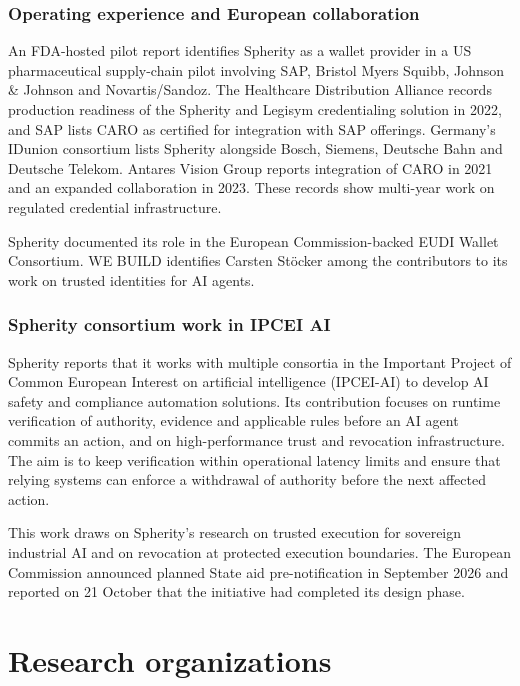 \subsubsection{Operating experience and European collaboration}

An FDA-hosted pilot report identifies Spherity as a wallet provider in a US pharmaceutical supply-chain pilot involving SAP, Bristol Myers Squibb, Johnson \& Johnson and Novartis/Sandoz. The Healthcare Distribution Alliance records production readiness of the Spherity and Legisym credentialing solution in 2022, and SAP lists CARO as certified for integration with SAP offerings. Germany's IDunion consortium lists Spherity alongside Bosch, Siemens, Deutsche Bahn and Deutsche Telekom. Antares Vision Group reports integration of CARO in 2021 and an expanded collaboration in 2023. These records show multi-year work on regulated credential infrastructure.~\cite{src50,src51,src52,src53,src54}

Spherity documented its role in the European Commission-backed EUDI Wallet Consortium. WE BUILD identifies Carsten Stöcker among the contributors to its work on trusted identities for AI agents.~\cite{src55,src56,src57,src58}

\subsubsection{Spherity consortium work in IPCEI AI}

Spherity reports that it works with multiple consortia in the Important Project of Common European Interest on artificial intelligence (IPCEI-AI) to develop AI safety and compliance automation solutions. Its contribution focuses on runtime verification of authority, evidence and applicable rules before an AI agent commits an action, and on high-performance trust and revocation infrastructure. The aim is to keep verification within operational latency limits and ensure that relying systems can enforce a withdrawal of authority before the next affected action.~\cite{src96}

This work draws on Spherity's research on trusted execution for sovereign industrial AI and on revocation at protected execution boundaries. The European Commission announced planned State aid pre-notification in September 2026 and reported on 21 October that the initiative had completed its design phase.~\cite{src7,src59,src60,src94,src97}

\FloatBarrier

\section{Research organizations}
\label{sec:research-organizations}

